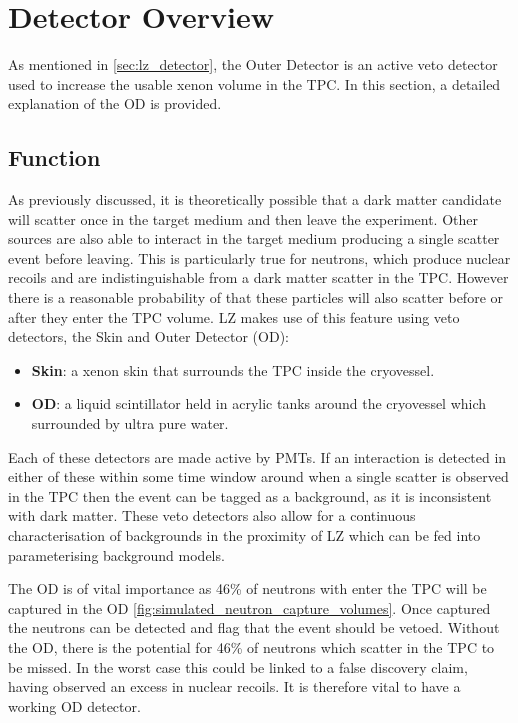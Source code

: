 \section{Detector Overview} \label{OD_detector_overview}
\par
As mentioned in \autoref{sec:lz_detector}, the Outer Detector is an active veto detector used to increase the usable xenon volume in the TPC.
In this section, a detailed explanation of the OD is provided.

\subsection{Function}
\par
As previously discussed, it is theoretically possible that a dark matter candidate will scatter once in the target medium and then leave the experiment.
Other sources are also able to interact in the target medium producing a single scatter event before leaving.
This is particularly true for neutrons, which produce nuclear recoils and are indistinguishable from a dark matter scatter in the TPC.
However there is a reasonable probability of that these particles will also scatter before or after they enter the TPC volume.
LZ makes use of this feature using veto detectors, the Skin and Outer Detector (OD):
\begin{itemize}
    \item \textbf{Skin}: a xenon skin that surrounds the TPC inside the cryovessel.
    \item \textbf{OD}: a liquid scintillator held in acrylic tanks around the cryovessel which surrounded by ultra pure water.
\end{itemize}
Each of these detectors are made active by PMTs.
If an interaction is detected in either of these within some time window around when a single scatter is observed in the TPC then the event can be tagged as a background, as it is inconsistent with dark matter.
These veto detectors also allow for a continuous characterisation of backgrounds in the proximity of LZ which can be fed into parameterising background models.

\par
The OD is of vital importance as 46\% of neutrons with enter the TPC will be captured in the OD \autoref{fig:simulated_neutron_capture_volumes}.
Once captured the neutrons can be detected and flag that the event should be vetoed. 
Without the OD, there is the potential for 46\% of neutrons which scatter in the TPC to be missed.
In the worst case this could be linked to a false discovery claim, having observed an excess in nuclear recoils.
It is therefore vital to have a working OD detector.

